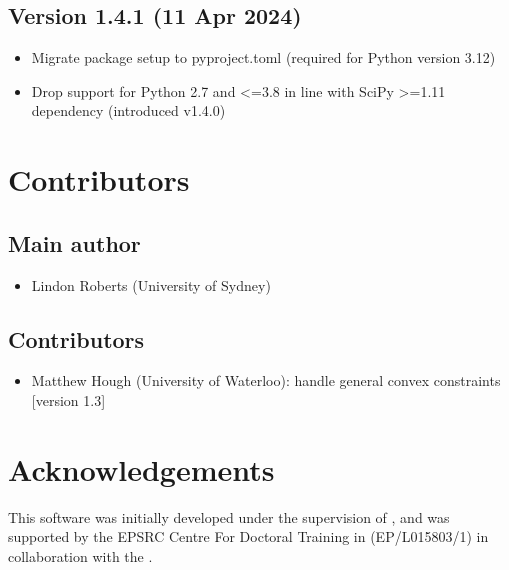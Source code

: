 \documentclass[letterpaper,10pt,english]{sphinxmanual}
\begin{document}
\section{Version 1.4.1 (11 Apr 2024)}
\label{\detokenize{history:version-1-4-1-11-apr-2024}}\begin{itemize}
\item {} 
\sphinxAtStartPar
Migrate package setup to pyproject.toml (required for Python version 3.12)

\item {} 
\sphinxAtStartPar
Drop support for Python 2.7 and \textless{}=3.8 in line with SciPy \textgreater{}=1.11 dependency (introduced v1.4.0)

\end{itemize}

\sphinxstepscope


\chapter{Contributors}
\label{\detokenize{contributors:contributors}}\label{\detokenize{contributors::doc}}

\section{Main author}
\label{\detokenize{contributors:main-author}}\begin{itemize}
\item {} 
\sphinxAtStartPar
Lindon Roberts (University of Sydney)

\end{itemize}


\section{Contributors}
\label{\detokenize{contributors:id1}}\begin{itemize}
\item {} 
\sphinxAtStartPar
Matthew Hough (University of Waterloo): handle general convex constraints {[}version 1.3{]}

\end{itemize}


\chapter{Acknowledgements}
\label{\detokenize{index:acknowledgements}}
\sphinxAtStartPar
This software was initially developed under the supervision of , and was supported by the EPSRC Centre For Doctoral Training in  (EP/L015803/1) in collaboration with the .
\end{document}
